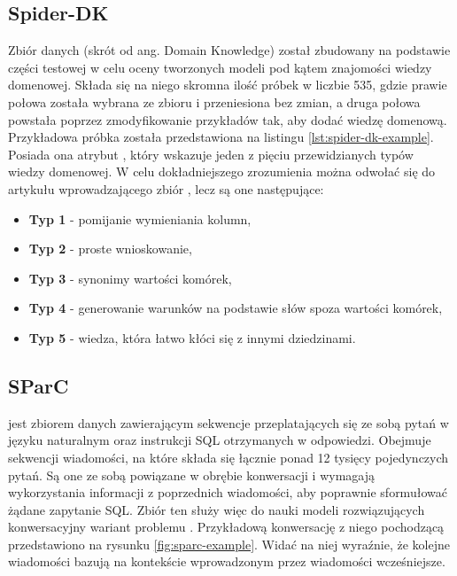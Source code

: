 \begin{minipage}{\linewidth}

\end{minipage}

\subsection{Spider-DK}
Zbiór danych   (skrót od ang. Domain Knowledge) został zbudowany na podstawie części testowej  w celu oceny tworzonych modeli pod kątem znajomości wiedzy domenowej. Składa się na niego skromna ilość próbek w liczbie 535, gdzie prawie połowa została wybrana ze zbioru  i przeniesiona bez zmian, a druga połowa powstała poprzez zmodyfikowanie przykładów tak, aby dodać wiedzę domenową. Przykładowa próbka została przedstawiona na listingu \ref{lst:spider-dk-example}. Posiada ona atrybut , który wskazuje jeden z pięciu przewidzianych typów wiedzy domenowej. W celu dokładniejszego zrozumienia można odwołać się do artykułu wprowadzającego zbiór , lecz są one następujące:
\begin{itemize}
    \item \textbf{Typ 1} - pomijanie wymieniania kolumn,
    \item \textbf{Typ 2} - proste wnioskowanie,
    \item \textbf{Typ 3} - synonimy wartości komórek,
    \item \textbf{Typ 4} - generowanie warunków na podstawie słów spoza wartości komórek,
    \item \textbf{Typ 5} - wiedza, która łatwo kłóci się z innymi dziedzinami.
\end{itemize}

\begin{minipage}{\linewidth}

\end{minipage}

\subsection{SParC}
  jest zbiorem danych zawierającym sekwencje przeplatających się ze sobą pytań w języku naturalnym oraz instrukcji SQL otrzymanych w odpowiedzi. Obejmuje  sekwencji wiadomości, na które składa się łącznie ponad 12 tysięcy pojedynczych pytań. Są one ze sobą powiązane w obrębie konwersacji i wymagają wykorzystania informacji z poprzednich wiadomości, aby poprawnie sformułować żądane zapytanie SQL. Zbiór ten służy więc do nauki modeli rozwiązujących konwersacyjny wariant problemu . Przykładową konwersację z niego pochodzącą przedstawiono na rysunku \ref{fig:sparc-example}. Widać na niej wyraźnie, że kolejne wiadomości bazują na kontekście wprowadzonym przez wiadomości wcześniejsze.

